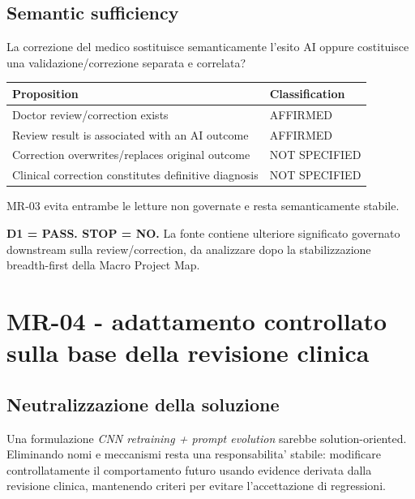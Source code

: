 \documentclass[11pt,a4paper]{article}
\begin{document}
\subsection{Semantic sufficiency}

\begin{ddtacheck}[title={Smallest critical proposition}]
La correzione del medico sostituisce semanticamente l'esito AI oppure costituisce una validazione/correzione separata e correlata?
\end{ddtacheck}

\begin{tabularx}{\textwidth}{L{70mm}L{33mm}}
\toprule
\textbf{Proposition} & \textbf{Classification} \\
\midrule
Doctor review/correction exists & AFFIRMED \\
Review result is associated with an AI outcome & AFFIRMED \\
Correction overwrites/replaces original outcome & NOT SPECIFIED \\
Clinical correction constitutes definitive diagnosis & NOT SPECIFIED \\
\bottomrule
\end{tabularx}

MR-03 evita entrambe le letture non governate e resta semanticamente stabile.

\begin{ddtacore}[title={MR-03 disposition}]
\textbf{D1 = PASS. STOP = NO.} La fonte contiene ulteriore significato governato downstream sulla review/correction, da analizzare dopo la stabilizzazione breadth-first della Macro Project Map.
\end{ddtacore}

\section{MR-04 - adattamento controllato sulla base della revisione clinica}

\subsection{Neutralizzazione della soluzione}

Una formulazione \emph{CNN retraining + prompt evolution} sarebbe solution-oriented. Eliminando nomi e meccanismi resta una responsabilita' stabile: modificare controllatamente il comportamento futuro usando evidence derivata dalla revisione clinica, mantenendo criteri per evitare l'accettazione di regressioni.
\end{document}
